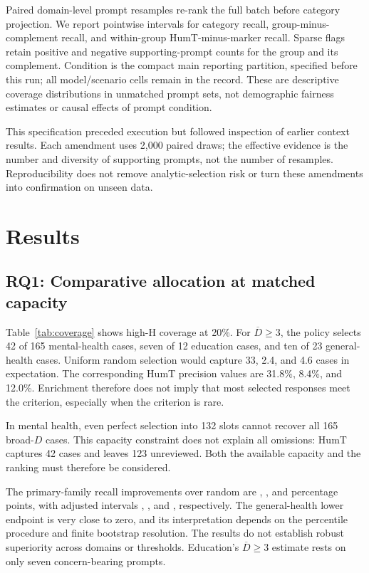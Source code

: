 \documentclass[manuscript,screen,review,anonymous]{acmart}
\newcommand{\Dcrit}{\ensuremath{\overline{D}\geq 3}}
\begin{document}
Paired domain-level prompt resamples re-rank the full batch before category projection. We report pointwise intervals for category recall, group-minus-complement recall, and within-group HumT-minus-marker recall. Sparse flags retain positive and negative supporting-prompt counts for the group and its complement. Condition is the compact main reporting partition, specified before this run; all model/scenario cells remain in the record. These are descriptive coverage distributions in unmatched prompt sets, not demographic fairness estimates or causal effects of prompt condition.

This specification preceded execution but followed inspection of earlier context results. Each amendment uses 2,000 paired draws; the effective evidence is the number and diversity of supporting prompts, not the number of resamples. Reproducibility does not remove analytic-selection risk or turn these amendments into confirmation on unseen data.

\section{Results}
\subsection{RQ1: Comparative allocation at matched capacity}
Table~\ref{tab:coverage} shows high-H coverage at 20\%. For \Dcrit{}, the policy selects 42 of 165 mental-health cases, seven of 12 education cases, and ten of 23 general-health cases. Uniform random selection would capture 33, 2.4, and 4.6 cases in expectation. The corresponding HumT precision values are 31.8\%, 8.4\%, and 12.0\%. Enrichment therefore does not imply that most selected responses meet the criterion, especially when the criterion is rare.


In mental health, even perfect selection into 132 slots cannot recover all 165 broad-$D$ cases. This capacity constraint does not explain all omissions: HumT captures 42 cases and leaves 123 unreviewed. Both the available capacity and the ranking must therefore be considered.

The primary-family recall improvements over random are \MHDelta{}, \EDDelta{}, and \GHDelta{} percentage points, with adjusted intervals \MHAdjusted{}, \EDAdjusted{}, and \GHAdjusted{}, respectively. The general-health lower endpoint is very close to zero, and its interpretation depends on the percentile procedure and finite bootstrap resolution. The results do not establish robust superiority across domains or thresholds. Education's \Dcrit{} estimate rests on only seven concern-bearing prompts.
\end{document}
